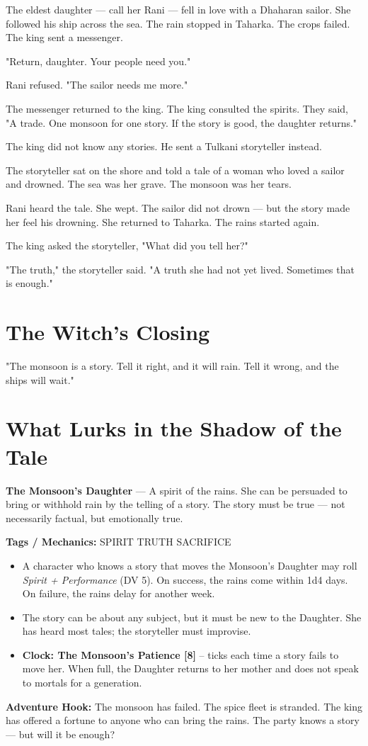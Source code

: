 \documentclass[10pt,twoside]{book}
\newcommand{\tag}[1]{\textsc{#1}}
\begin{document}
The eldest daughter --- call her Rani --- fell in love with a Dhaharan sailor. She followed his ship across the sea. The rain stopped in Taharka. The crops failed. The king sent a messenger.

"Return, daughter. Your people need you."

Rani refused. "The sailor needs me more."

The messenger returned to the king. The king consulted the spirits. They said, "A trade. One monsoon for one story. If the story is good, the daughter returns."

The king did not know any stories. He sent a Tulkani storyteller instead.

The storyteller sat on the shore and told a tale of a woman who loved a sailor and drowned. The sea was her grave. The monsoon was her tears.

Rani heard the tale. She wept. The sailor did not drown --- but the story made her feel his drowning. She returned to Taharka. The rains started again.

The king asked the storyteller, "What did you tell her?"

"The truth," the storyteller said. "A truth she had not yet lived. Sometimes that is enough."

\section*{The Witch's Closing}
"The monsoon is a story. Tell it right, and it will rain. Tell it wrong, and the ships will wait."

\section*{What Lurks in the Shadow of the Tale}
\begin{infobox}
\textbf{The Monsoon's Daughter} --- A spirit of the rains. She can be persuaded to bring or withhold rain by the telling of a story. The story must be true --- not necessarily factual, but emotionally true.

\textbf{Tags / Mechanics:} \tag{SPIRIT} \tag{TRUTH} \tag{SACRIFICE}

\begin{itemize}
\item A character who knows a story that moves the Monsoon's Daughter may roll \textit{Spirit + Performance} (DV 5). On success, the rains come within 1d4 days. On failure, the rains delay for another week.
\item The story can be about any subject, but it must be new to the Daughter. She has heard most tales; the storyteller must improvise.
\item \textbf{Clock: The Monsoon's Patience [8]} -- ticks each time a story fails to move her. When full, the Daughter returns to her mother and does not speak to mortals for a generation.
\end{itemize}

\textbf{Adventure Hook:} The monsoon has failed. The spice fleet is stranded. The king has offered a fortune to anyone who can bring the rains. The party knows a story --- but will it be enough?
\end{infobox}
\end{document}
